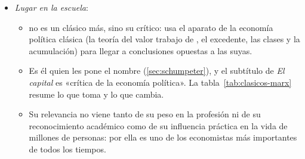 \documentclass[11pt]{article}
\begin{document}
\begin{itemize}
  \begin{itemize}
  \item El materialismo histórico (\ref{sec:marx-aportaciones}), con una exposición que va de lo abstracto (la mercancía) a lo concreto (los precios, la renta, el crédito).
  \item Sus leyes no son naturales ni eternas, como las de los clásicos: son las del modo de producción capitalista, que es histórico y pasará.
  \end{itemize}
\item \emph{Lugar en la escuela}:
  \begin{itemize}
  \item {} no es un clásico más, sino su crítico: usa el aparato de la economía política clásica (la teoría del valor trabajo de , el excedente, las clases y la acumulación) para llegar a conclusiones opuestas a las suyas\nocite{LandrethColander2006Historia}.
  \item Es él quien les pone el nombre (\ref{sec:schumpeter}), y el subtítulo de \emph{El capital} es «crítica de la economía política». La tabla~\ref{tab:clasicos-marx} resume lo que toma y lo que cambia.
  \item Su relevancia no viene tanto de su peso en la profesión ni de su reconocimiento académico como de su influencia práctica en la vida de millones de personas: por ella es uno de los economistas más importantes de todos los tiempos.
  \end{itemize}
\end{itemize}
\end{document}
